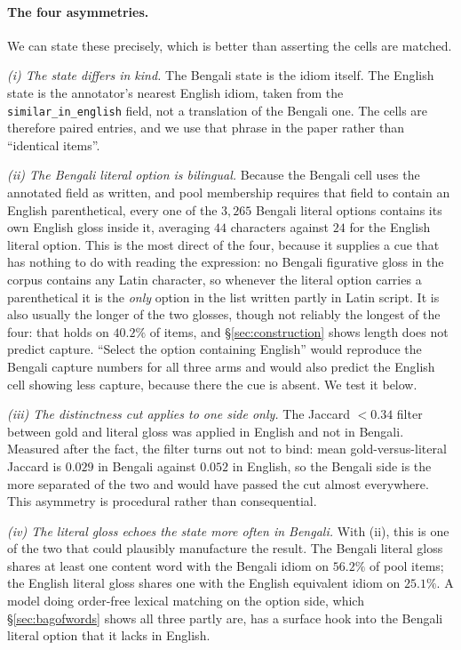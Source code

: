 \documentclass[11pt]{article}
\begin{document}
\paragraph{The four asymmetries.} We can state these precisely, which is better
than asserting the cells are matched.

\emph{(i) The state differs in kind.} The Bengali state is the idiom itself. The
English state is the annotator's nearest English idiom, taken from the
\texttt{similar\_in\_english} field, not a translation of the Bengali one. The
cells are therefore paired entries, and we use that phrase in the paper rather
than ``identical items''.

\emph{(ii) The Bengali literal option is bilingual.} Because the Bengali cell uses
the annotated field as written, and pool membership requires that field to contain
an English parenthetical, every one of the $3{,}265$ Bengali literal options
contains its own English gloss inside it, averaging $44$ characters against $24$
for the English literal option. This is the most direct of the four, because it
supplies a cue that has nothing to do with reading the expression: no Bengali
figurative gloss in the corpus contains any Latin character, so whenever the
literal option carries a parenthetical it is the \emph{only} option in the list
written partly in Latin script. It is also usually the longer of the two glosses,
though not reliably the longest of the four: that holds on $40.2\%$ of items, and
\S\ref{sec:construction} shows length does not predict capture. ``Select the option
containing English'' would reproduce the Bengali capture numbers for all three
arms and would also predict the English cell showing less capture, because there
the cue is absent. We test it below.

\emph{(iii) The distinctness cut applies to one side only.} The Jaccard
$< 0.34$ filter between gold and literal gloss was applied in English and not in
Bengali. Measured after the fact, the filter turns out not to bind: mean gold-versus-literal
Jaccard is $0.029$ in Bengali against $0.052$ in English, so the
Bengali side is the more separated of the two and would have passed the cut almost
everywhere. This asymmetry is procedural rather than consequential.

\emph{(iv) The literal gloss echoes the state more often in Bengali.} With (ii),
this is one of the two that could plausibly manufacture the result. The Bengali literal gloss shares at
least one content word with the Bengali idiom on $56.2\%$ of pool items; the English
literal gloss shares one with the English equivalent idiom on $25.1\%$. A model
doing order-free lexical matching on the option side, which
\S\ref{sec:bagofwords} shows all three partly are, has a surface hook into the
Bengali literal option that it lacks in English.
\end{document}
